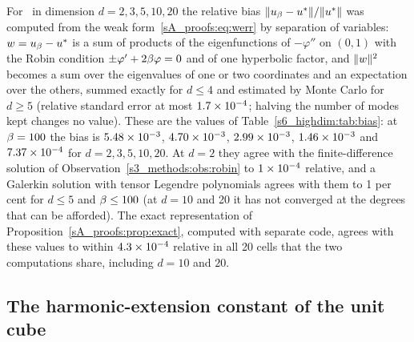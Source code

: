 \begin{observation}\label{sA_proofs:obs:biasd}
For \Pone\ in dimension $d=2,3,5,10,20$ the relative bias
$\lVert u_{\beta}-u^{*}\rVert/\lVert u^{*}\rVert$ was computed from the weak
form~\eqref{sA_proofs:eq:werr} by separation of variables: $w=u_{\beta}-u^{*}$ is a sum of
products of the eigenfunctions of $-\varphi''$ on $(0,1)$ with the Robin condition
$\pm\varphi'+2\beta\varphi=0$ and of one hyperbolic factor, and $\lVert w\rVert^2$ becomes a sum
over the eigenvalues of one or two coordinates and an expectation over the others, summed exactly
for $d\le4$ and estimated by Monte Carlo for $d\ge5$ (relative standard error at most
$1.7\times 10^{-4}$; halving the number of modes kept changes no value). These are the values of
Table~\ref{s6_highdim:tab:bias}: at $\beta=100$ the bias is $5.48\times 10^{-3}$, $4.70\times 10^{-3}$,
$2.99\times 10^{-3}$, $1.46\times 10^{-3}$ and $7.37\times 10^{-4}$ for $d=2,3,5,10,20$. At $d=2$ they agree
with the finite-difference solution of Observation~\ref{s3_methods:obs:robin} to $1\times 10^{-4}$
relative, and a Galerkin solution with tensor Legendre polynomials agrees with them to 1 per cent for
$d\le5$ and $\beta\le100$ (at $d=10$ and 20 it has not converged at the degrees that can be afforded).
The exact representation of Proposition~\ref{sA_proofs:prop:exact}, computed with separate code,
agrees with these values to within $4.3\times 10^{-4}$ relative in all 20 cells that the two
computations share, including $d=10$ and $20$.
\end{observation}

\subsection{The harmonic-extension constant of the unit cube}\label{sA_proofs:sec:kappa}

